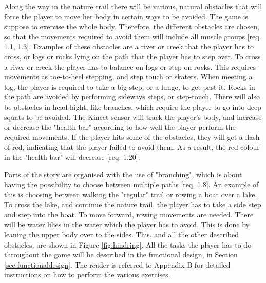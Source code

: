 Along the way in the nature trail there will be various, natural obstacles that will force the player to move her body in certain ways to be avoided. The game is suppose to exercise the whole body. Therefore, the different obstacles are chosen, so that the movements required to avoid them will include all muscle groups [req. 1.1, 1.3]. Examples of these obstacles are a river or creek that the player has to cross, or logs or rocks lying on the path that the player has to step over. To cross a river or creek the player has to balance on logs or step on rocks. This requires movements as toe-to-heel stepping, and step touch or skaters. When meeting a log, the player is required to take a big step, or a lunge, to get past it. Rocks in the path are avoided by performing sideways steps, or step-touch. There will also be obstacles in head hight, like branches, which require the player to go into deep squats to be avoided. The Kinect sensor will track the player's body, and increase or decrease the "health-bar" according to how well the player perform the required movements. If the player hits some of the obstacles, they will get a flash of red, indicating that the player failed to avoid them. As a result, the red colour in the "health-bar" will decrease [req. 1.20].

Parts of the story are organised with the use of "branching", which is about having the possibility to choose between multiple paths [req. 1.8]. An example of this is choosing between walking the "regular" trail or rowing a boat over a lake. To cross the lake, and continue the nature trail, the player has to take a side step and step into the boat. To move forward, rowing movements are needed. There will be water lilies in the water which the player has to avoid. This is done by leaning the upper body over to the sides. This, and all the other described obstacles, are shown in Figure \ref{fig:hindring}. All the tasks the player has to do throughout the game will be described in the functional design, in Section \ref{sec:functionaldesign}. The reader is referred to Appendix B for detailed instructions on how to perform the various exercises.

